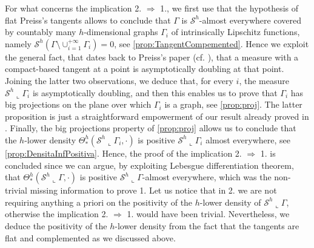 \documentclass[10pt, a4paper,
oneside, headinclude,footinclude]{scrartcl}
\begin{document}
For what concerns the implication 2. $\Rightarrow$ 1., we first use that the hypothesis of flat Preiss's tangents allows to conclude that $\Gamma$ is $\mathcal{S}^h$-almost everywhere covered by countably many $h$-dimensional graphs $\Gamma_i$ of  intrinsically Lipschitz functions, namely $\mathcal{S}^h(\Gamma\setminus \cup_{i=1}^{+\infty}\Gamma_i)=0$, see \cref{prop:TangentCompemented}. Hence we exploit the general fact, that dates back to Preiss's paper (cf. \cite[Corollary 2.7]{Preiss1987GeometryDensities}), that a measure with a compact-based tangent at a point is  asymptotically doubling at that point. Joining the latter two observations, we deduce that, for every $i$, the measure $\mathcal{S}^h\llcorner\Gamma_i$ is asymptotically doubling, and then this enables us to prove that $\Gamma_i$ has big projections on the plane over which $\Gamma_i$ is a graph, see \cref{prop:proj}. The latter proposition is just a straightforward empowerment of our result already proved in \cite[Proposition 4.6]{antonelli2020rectifiable}. Finally, the big projections property of \cref{prop:proj} allows us to conclude that the $h$-lower density $\Theta^h_*(\mathcal{S}^h\llcorner\Gamma_i,\cdot)$ is positive $\mathcal{S}^h\llcorner\Gamma_i$ almost everywhere, see \cref{prop:DensitaInfPositiva}. Hence, the proof of the implication 2. $\Rightarrow$ 1. is concluded since we can argue, by exploiting Lebesgue differentiation theorem, that $\Theta^{h}_*(\mathcal{S}^h\llcorner\Gamma,\cdot)$ is positive $\mathcal{S}^h\llcorner\Gamma$-almost everywhere, which was the non-trivial missing information to prove 1. Let us notice that in 2. we are not requiring anything a priori on the positivity of the $h$-lower density of $\mathcal{S}^h\llcorner\Gamma$, otherwise the implication 2. $\Rightarrow$ 1. would have been trivial. Nevertheless, we deduce the positivity of the $h$-lower density from the fact that the tangents are flat and complemented as we discussed above. 
\end{document}
